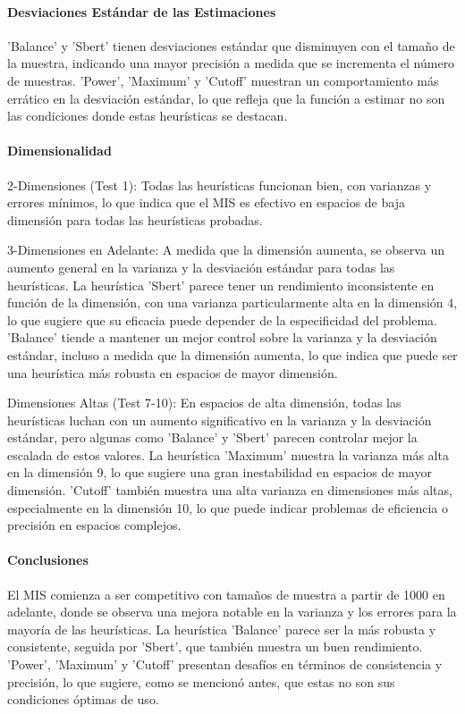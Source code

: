 \documentclass{article}
\begin{document}
\paragraph{Desviaciones Estándar de las Estimaciones}
'Balance' y 'Sbert' tienen desviaciones estándar que disminuyen con el tamaño de la muestra, indicando una mayor precisión a medida que se incrementa el número de muestras.
'Power', 'Maximum' y 'Cutoff' muestran un comportamiento más errático en la desviación estándar, lo que refleja que la función a estimar no son las condiciones donde estas heurísticas se destacan.

\paragraph{Dimensionalidad}
2-Dimensiones (Test 1): Todas las heurísticas funcionan bien, con varianzas y errores mínimos, lo que indica que el MIS es efectivo en espacios de baja dimensión para todas las heurísticas probadas.

3-Dimensiones en Adelante: A medida que la dimensión aumenta, se observa un aumento general en la varianza y la desviación estándar para todas las heurísticas. La heurística 'Sbert' parece tener un rendimiento inconsistente en función de la dimensión, con una varianza particularmente alta en la dimensión 4, lo que sugiere que su eficacia puede depender de la especificidad del problema.
'Balance' tiende a mantener un mejor control sobre la varianza y la desviación estándar, incluso a medida que la dimensión aumenta, lo que indica que puede ser una heurística más robusta en espacios de mayor dimensión.

Dimensiones Altas (Test 7-10): En espacios de alta dimensión, todas las heurísticas luchan con un aumento significativo en la varianza y la desviación estándar, pero algunas como 'Balance' y 'Sbert' parecen controlar mejor la escalada de estos valores.
La heurística 'Maximum' muestra la varianza más alta en la dimensión 9, lo que sugiere una gran inestabilidad en espacios de mayor dimensión.
'Cutoff' también muestra una alta varianza en dimensiones más altas, especialmente en la dimensión 10, lo que puede indicar problemas de eficiencia o precisión en espacios complejos.

\paragraph{Conclusiones}
El MIS comienza a ser competitivo con tamaños de muestra a partir de 1000 en adelante, donde se observa una mejora notable en la varianza y los errores para la mayoría de las heurísticas. La heurística 'Balance' parece ser la más robusta y consistente, seguida por 'Sbert', que también muestra un buen rendimiento. 'Power', 'Maximum' y 'Cutoff' presentan desafíos en términos de consistencia y precisión, lo que sugiere, como se mencionó antes, que estas no son sus condiciones óptimas de uso.
\end{document}
